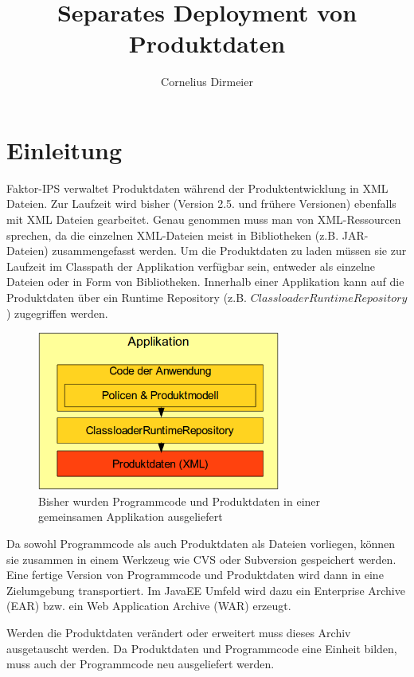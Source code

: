 \documentclass[headsepline=true, footsepline=true]{scrartcl}
\title{Separates Deployment von Produktdaten}
\author{Cornelius Dirmeier}
\begin{document}
\maketitle

\section{Einleitung}

Faktor-IPS verwaltet Produktdaten während der Produktentwicklung in XML Dateien.
Zur Laufzeit wird bisher (Version 2.5. und frühere Versionen) ebenfalls mit XML
Dateien gearbeitet. Genau genommen muss man von XML-Ressourcen sprechen, da die
einzelnen XML-Dateien meist in Bibliotheken (z.B. JAR-Dateien) zusammengefasst
werden. Um die Produktdaten zu laden müssen sie zur Laufzeit im Classpath der
Applikation verfügbar sein, entweder als einzelne Dateien oder in Form von
Bibliotheken. Innerhalb einer Applikation kann auf die Produktdaten über ein
Runtime Repository (z.B. $ClassloaderRuntimeRepository$) zugegriffen werden.

\begin{figure}[htb] \centering
\includegraphics[width=8cm]{./pics/old_architecture.png} \caption{Bisher wurden
Programmcode und Produktdaten in einer gemeinsamen Applikation ausgeliefert}
\label{old_architecture}
\end{figure}

Da sowohl Programmcode als auch Produktdaten als Dateien vorliegen, können sie
zusammen in einem Werkzeug wie CVS oder Subversion gespeichert werden. Eine
fertige Version von Programmcode und Produktdaten wird dann in eine Zielumgebung
transportiert. Im JavaEE Umfeld wird dazu ein Enterprise Archive (EAR) bzw. ein
Web Application Archive (WAR) erzeugt.

Werden die Produktdaten verändert oder erweitert muss dieses Archiv ausgetauscht
werden. Da Produktdaten und Programmcode eine Einheit bilden, muss auch der
Programmcode neu ausgeliefert werden.
\end{document}
